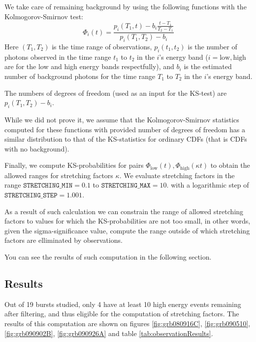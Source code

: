 \documentclass{article}
\begin{document}
We take care of remaining background by using the following functions with the Kolmogorov-Smirnov test:
\begin{equation}
	\Phi_i\left(t\right) = \frac{p_i\left(T_1, t\right) - b_i \frac{t-T_1}{T_2-T_1}}{p_i\left(T_1, T_2\right) - b_i}
\end{equation}
Here $\left(T_1, T_2\right)$ is the time range of observations, $p_i\left(t_1, t_2\right)$ is the number of photons observed in the time range $t_1$ to $t_2$ in the $i$'s energy band ($i=\text{low},\text{high}$ are for the low and high energy bands respectfully), and $b_i$ is the estimated number of background photons for the time range $T_1$ to $T_2$ in the $i$'s energy band.

The numbers of degrees of freedom (used as an input for the KS-test) are $p_i\left(T_1, T_2\right) - b_i$.

While we did not prove it, we assume that the Kolmogorov-Smirnov statistics computed for these functions with provided number of degrees of freedom has a similar distribution to that of the KS-statistics for ordinary CDFs (that is CDFs with no background).

Finally, we compute KS-probabilities for pairs $\Phi_\text{low}\left(t\right), \Phi_\text{high}\left(\kappa t\right)$ to obtain the allowed ranges for stretching factors $\kappa$. We evaluate stretching factors in the range $\texttt{STRETCHING\_MIN} = 0.1$ to $\texttt{STRETCHING\_MAX} = 10.$ with a logarithmic step of $\texttt{STRETCHING\_STEP} = 1.001$.

As a result of such calculation we can constrain the range of allowed stretching factors to values for which the KS-probabilities are not too small, in other words, given the sigma-significance value, compute the range outside of which stretching factors are elliminated by observations.

You can see the results of such computation in the following section.

\subsection{Results}

Out of 19 bursts studied, only 4 have at least 10 high energy events remaining after filtering, and thus eligible for the computation of stretching factors. The results of this computation are shown on figures \ref{fig:grb080916C}, \ref{fig:grb090510}, \ref{fig:grb090902B}, \ref{fig:grb090926A} and table \ref{tab:observationResults}.
\end{document}
